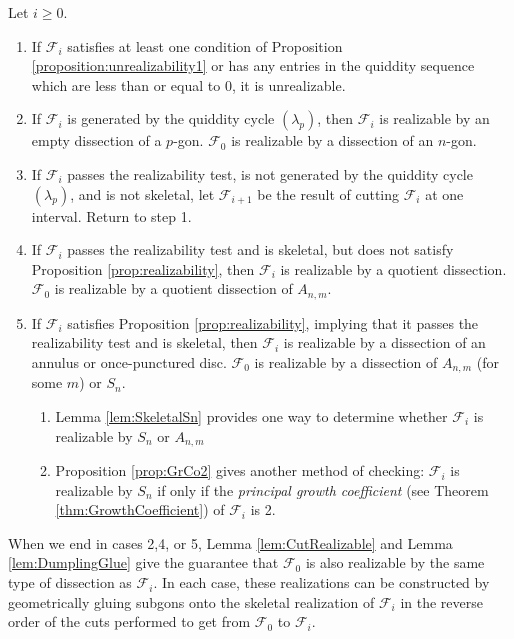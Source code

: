 \documentclass[12pt]{article}
\theoremstyle{remark}
\newcommand*{\F}{\mathcal{F}}
\begin{document}
Let $i \geq 0$.
\begin{enumerate}
    \item If $\F_i$ satisfies at least one condition of Proposition \ref{proposition:unrealizability1} or has any entries in the quiddity sequence which are less than or equal to 0, it is unrealizable.
    \item If $\F_i$ is generated by the quiddity cycle $(\lambda_p)$, then $\F_i$ is realizable by an empty dissection of a $p$-gon. $\F_0$ is realizable by a dissection of an $n$-gon.
    \item If $\F_i$ passes the realizability test, is not generated by the quiddity cycle $(\lambda_p)$, and is not skeletal, let $\F_{i+1}$ be the result of cutting $\F_i$ at one interval. Return to step 1.
    \item If $\F_i$ passes the realizability test and is skeletal, but does not satisfy Proposition \ref{prop:realizability}, then $\F_i$ is realizable by a quotient dissection. $\F_0$ is realizable by a quotient dissection of $A_{n,m}$.    
    \item If $\F_i$ satisfies Proposition \ref{prop:realizability}, implying that it passes the realizability test and is skeletal, then $\F_i$ is realizable by a dissection of an annulus or once-punctured disc. $\F_0$ is realizable by a dissection of $A_{n,m}$ (for some $m$) or $S_n$.
    \begin{enumerate}
        \item Lemma \ref{lem:SkeletalSn} provides one way to determine whether $\F_i$ is realizable by $S_n$ or $A_{n,m}$ 
        \item Proposition \ref{prop:GrCo2} gives another method of checking: $\F_i$ is realizable by $S_n$ if only if the \emph{principal growth coefficient} (see Theorem \ref{thm:GrowthCoefficient}) of $\F_i$ is 2. 
    \end{enumerate}
\end{enumerate}

When we end in cases 2,4, or 5, Lemma \ref{lem:CutRealizable} and Lemma \ref{lem:DumplingGlue} give the guarantee that $\F_0$ is also realizable by the same type of dissection as $\F_i$. In each case, these realizations can be constructed by geometrically gluing subgons onto the skeletal realization of $\F_i$ in the reverse order of the cuts performed to get from $\F_0$ to $\F_i$.
\end{document}
